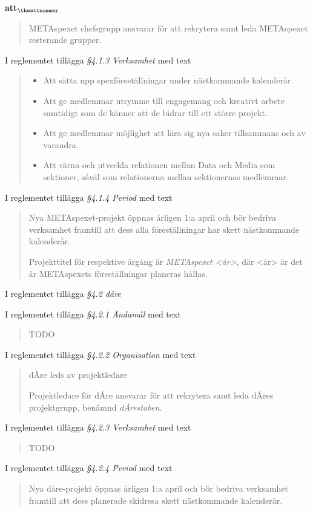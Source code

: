 \documentclass[a4paper]{article}
\begin{document}
\begin{list}{\bf att$_{\theattnummer}$}{}
\begin{quote}
        METAspexet chefsgrupp ansvarar för att rekrytera samt leda METAspexet resterande grupper.
    \end{quote}
\item I reglementet tillägga \textit{\S4.1.3 Verksamhet} med text
    \begin{quote}
        \begin{itemize}
            \item Att sätta upp spexföreställningar under nästkommande kalenderår.
            \item Att ge medlemmar utrymme till engagemang och kreativt arbete samtidigt som de känner att de bidrar till ett större projekt.
            \item Att ge medlemmar möjlighet att lära sig nya saker tillsammans och av varandra.
            \item Att värna och utveckla relationen mellan Data och Media som sektioner, såväl som relationerna mellan sektionernas medlemmar.
        \end{itemize}
    \end{quote}
\item I reglementet tillägga \textit{\S4.1.4 Period} med text
    \begin{quote} Nya METAspexet-projekt öppnas årligen 1:a april och bör bedriva verksamhet framtill att dess alla föreställningar har skett nästkommande kalenderår.

    Projekttitel för respektive årgång är \textit{METAspexet <år>}, där <år> är det år METAspexets föreställningar planeras hållas.
    \end{quote}


\item I reglementet tillägga \textit{\S4.2 dåre}
\item I reglementet tillägga \textit{\S4.2.1 Ändamål} med text
    \begin{quote}
        TODO
    \end{quote}
\item I reglementet tillägga \textit{\S4.2.2 Organisation} med text
    \begin{quote}
        dÅre leds av projektledare

        Projektledare för dÅre ansvarar för att rekrytera samt leda dÅres projektgrupp, benämnd \textit{dÅrestaben}.
    \end{quote}
\item I reglementet tillägga \textit{\S4.2.3 Verksamhet} med text
    \begin{quote}
        TODO
    \end{quote}
\item I reglementet tillägga \textit{\S4.2.4 Period} med text
    \begin{quote}
        Nya dåre-projekt öppnas årligen 1:a april och bör bedriva verksamhet framtill att dess planerade skidresa skett nästkommande kalenderår.


\end{quote}
\end{list}
\end{document}
